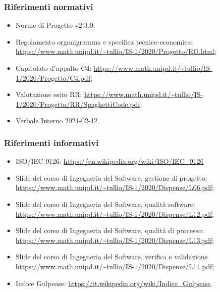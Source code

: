 \documentclass[../piano_di_qualifica.tex]{subfiles}
\begin{document}
\subsubsection{Riferimenti normativi}
\begin{itemize}
	\item Norme di Progetto v2.3.0;
	\item Regolamento organigramma e specifica tecnico-economica: \url{https://www.math.unipd.it/~tullio/IS-1/2020/Progetto/RO.html};
	\item Capitolato d’appalto C4: \url{https://www.math.unipd.it/~tullio/IS-1/2020/Progetto/C4.pdf};
	\item Valutazione esito RR: \url{https://www.math.unipd.it/~tullio/IS-1/2020/Progetto/RR/SpaghettiCode.pdf};
	\item Verbale Interno 2021-02-12.
\end{itemize}

\subsubsection{Riferimenti informativi}

\begin{itemize}
	\item ISO/IEC 9126: \url{https://en.wikipedia.org/wiki/ISO/IEC_9126}
	\item Slide del corso di Ingegneria del Software, gestione di progetto: \url{https://www.math.unipd.it/~tullio/IS-1/2020/Dispense/L06.pdf};
	\item Slide del corso di Ingegneria del Software, qualità software: \url{https://www.math.unipd.it/~tullio/IS-1/2020/Dispense/L12.pdf};
	\item Slide del corso di Ingegneria del Software, qualità di processo: \url{https://www.math.unipd.it/~tullio/IS-1/2020/Dispense/L13.pdf};
	\item Slide del corso di Ingegneria del Software, verifica e validazione \url{https://www.math.unipd.it/~tullio/IS-1/2020/Dispense/L14.pdf};
	\item Indice Gulpease: \url{https://it.wikipedia.org/wiki/Indice_Gulpease}.
\end{itemize}
\end{document}
